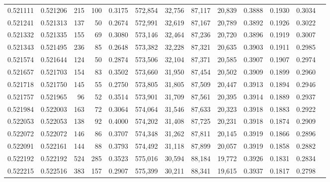 \begin{tabular}{rrrrrrrrrrrrr}
0.521111 & 0.521206 &   215 &   100 &                                     0.3175 & 572,854 &  32,756 &  87,117 &  20,839 & 0.3888 & 0.1930 & 0.3034 \\
0.521241 & 0.521313 &   137 &    50 &                                     0.2674 & 572,991 &  32,619 &  87,167 &  20,789 & 0.3892 & 0.1926 & 0.3022 \\
0.521332 & 0.521335 &   155 &    69 &                                     0.3080 & 573,146 &  32,464 &  87,236 &  20,720 & 0.3896 & 0.1919 & 0.3007 \\
0.521343 & 0.521495 &   236 &    85 &                                     0.2648 & 573,382 &  32,228 &  87,321 &  20,635 & 0.3903 & 0.1911 & 0.2985 \\
0.521574 & 0.521644 &   124 &    50 &                                     0.2874 & 573,506 &  32,104 &  87,371 &  20,585 & 0.3907 & 0.1907 & 0.2974 \\
0.521657 & 0.521703 &   154 &    83 &                                     0.3502 & 573,660 &  31,950 &  87,454 &  20,502 & 0.3909 & 0.1899 & 0.2960 \\
0.521718 & 0.521750 &   145 &    55 &                                     0.2750 & 573,805 &  31,805 &  87,509 &  20,447 & 0.3913 & 0.1894 & 0.2946 \\
0.521757 & 0.521965 &    96 &    52 &                                     0.3514 & 573,901 &  31,709 &  87,561 &  20,395 & 0.3914 & 0.1889 & 0.2937 \\
0.521984 & 0.522003 &   163 &    72 &                                     0.3064 & 574,064 &  31,546 &  87,633 &  20,323 & 0.3918 & 0.1883 & 0.2922 \\
0.522053 & 0.522053 &   138 &    92 &                                     0.4000 & 574,202 &  31,408 &  87,725 &  20,231 & 0.3918 & 0.1874 & 0.2909 \\
0.522072 & 0.522072 &   146 &    86 &                                     0.3707 & 574,348 &  31,262 &  87,811 &  20,145 & 0.3919 & 0.1866 & 0.2896 \\
0.522091 & 0.522161 &   144 &    88 &                                     0.3793 & 574,492 &  31,118 &  87,899 &  20,057 & 0.3919 & 0.1858 & 0.2882 \\
0.522192 & 0.522192 &   524 &   285 &                                     0.3523 & 575,016 &  30,594 &  88,184 &  19,772 & 0.3926 & 0.1831 & 0.2834 \\
0.522215 & 0.522516 &   383 &   157 &                                     0.2907 & 575,399 &  30,211 &  88,341 &  19,615 & 0.3937 & 0.1817 & 0.2798 \\

\end{tabular}
